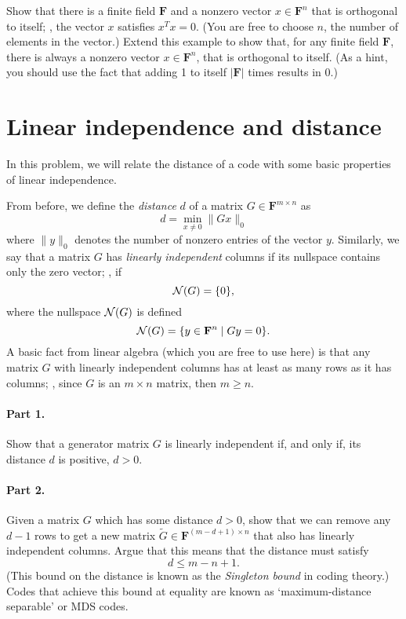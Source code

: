 \documentclass[12pt]{article}
\newcommand{\field}{\mathbf{F}}
\begin{document}
Show that there is a finite field $\field$ and a nonzero vector $x \in
\field^n$ that is orthogonal to itself; \ie, the vector $x$ satisfies $x^Tx =
0$. (You are free to choose $n$, the number of elements in the vector.) Extend
this example to show that, for any finite field $\field$, there is always a
nonzero vector $x \in \field^n$, that is orthogonal to itself. (As a hint, you
should use the fact that adding 1 to itself $|\field|$ times results in 0.)

\section{Linear independence and distance}
In this problem, we will relate the distance of a code with some basic
properties of linear independence.

From before, we define the \emph{distance} $d$ of a matrix $G \in \field^{m\times n}$
as
\[
    d = \min_{x \ne 0} \|Gx\|_0
\]
where $\|y\|_0$ denotes the number of nonzero entries of the vector $y$.
Similarly, we say that a matrix $G$ has \emph{linearly independent} columns if
its nullspace contains only the zero vector; \ie, if
\[
    {\mathcal N}(G) = \{0\},
\]
where the nullspace ${\mathcal N}(G)$ is defined
\[
    \nullspace(G) = \{y \in \field^n \mid Gy = 0\}.
\]
A basic fact from linear algebra (which you are free to use here) is that any
matrix $G$ with linearly independent columns has at least as many rows as it
has columns; \ie, since $G$ is an $m\times n$ matrix, then $m \ge n$.

\paragraph{Part 1.} Show that a generator matrix $G$ is linearly independent
if, and only if, its distance $d$ is positive, $d > 0$.

\paragraph{Part 2.} Given a matrix $G$ which has some distance $d > 0$, show
that we can remove any $d-1$ rows to get a new matrix $\tilde G \in
\field^{(m-d + 1)\times n}$ that also has linearly independent columns. Argue that
this means that the distance must satisfy
\[
    d \le m - n + 1.
\]
(This bound on the distance is known as the \emph{Singleton bound} in coding
theory.) Codes that achieve this bound at equality are known as
`maximum-distance separable' or MDS codes.
\end{document}
